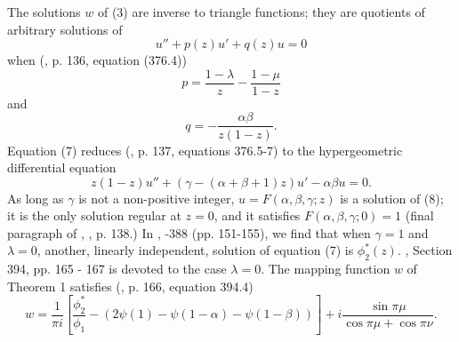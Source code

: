 \documentclass{article}
\begin{document}
The solutions $w$ of (3)
are inverse to triangle functions;
they are quotients of 
arbitrary solutions of
\begin{equation}
u'' + p(z)u' +q(z)u = 0
\end{equation}
when (\cite{caratheodory2}, 
p. 136, equation (376.4))
 $$
 p = \frac {1-\lambda}z-\frac {1-\mu}{1-z}
 $$
 and
 $$
 q = - \frac {\alpha \beta}{z(1-z)}.
 $$
Equation (7) reduces (\cite{caratheodory2}, p. 137, 
equations 376.5-7)
to the 
hypergeometric differential
equation 
\begin{equation}
z(1-z)u'' +(\gamma - (\alpha + \beta +1)z)u'
- \alpha \beta u = 0.
\end{equation}
As long as $\gamma$ is not a
non-positive integer, 
$u=F(\alpha,\beta,\gamma;z)$
is a solution of (8); it is 
the only solution
regular at $z = 0$, and it
satisfies 
$F(\alpha,\beta,\gamma;0) = 1$
(final paragraph of 
\cite{caratheodory2}, , 
p. 138.) 
 \newline \newline \noindent
 In  \cite{caratheodory2},
\textsection {}-388 
(pp. 151-155), we find that
when $\gamma = 1$
and $\lambda = 0$,
 another, linearly independent,
solution of equation (7) is $\phi_2^*(z)$.
\cite{caratheodory2}, Section 394, pp. 165 - 167 
 is 
devoted to the
case $\lambda = 0$. 
The mapping 
function $w$ of Theorem 1 
satisfies (\cite{caratheodory2}, 
p. 166,  equation 394.4)
\begin{equation}
 w = \frac 1{\pi i}
 \left [ \frac{\phi_2^*}{\phi_1} -
\left (2 \psi(1) - 
\psi(1 - \alpha)
- \psi(1-\beta) \right ) \right ] + 
i \frac{ \sin \pi \mu}
{\cos \pi \mu + \cos \pi \nu}.
\end{equation}
\end{document}

